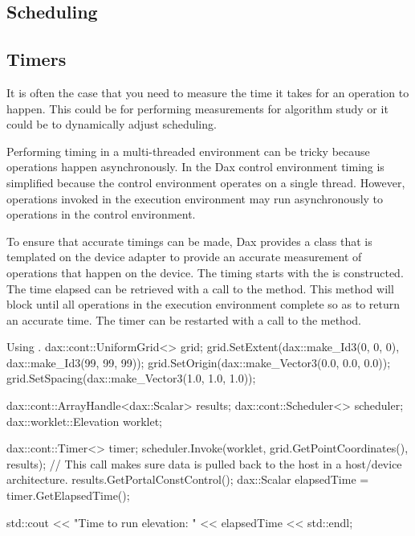 
\subsection{Scheduling}
\label{sec:Scheduling}


\subsection{Timers}
\label{sec:Timers}


It is often the case that you need to measure the time it takes for an
operation to happen. This could be for performing measurements for
algorithm study or it could be to dynamically adjust scheduling.

Performing timing in a multi-threaded environment can be tricky because
operations happen asynchronously. In the Dax control environment timing is
simplified because the control environment operates on a single
thread. However, operations invoked in the execution environment may run
asynchronously to operations in the control environment.

To ensure that accurate timings can be made, Dax provides a 
class that is templated on the device adapter to provide an accurate
measurement of operations that happen on the device. The timing starts with
the  is constructed. The time elapsed can be
retrieved with a call to the  method. This method
will block until all operations in the execution environment complete so as
to return an accurate time. The timer can be restarted with a call to the
 method.

\begin{daxexample}{Using \protect{}.}
dax::cont::UniformGrid<> grid;
grid.SetExtent(dax::make_Id3(0, 0, 0), dax::make_Id3(99, 99, 99));
grid.SetOrigin(dax::make_Vector3(0.0, 0.0, 0.0));
grid.SetSpacing(dax::make_Vector3(1.0, 1.0, 1.0));

dax::cont::ArrayHandle<dax::Scalar> results;
dax::cont::Scheduler<> scheduler;
dax::worklet::Elevation worklet;

dax::cont::Timer<> timer;
scheduler.Invoke(worklet, grid.GetPointCoordinates(), results);
// This call makes sure data is pulled back to the host in a host/device architecture.
results.GetPortalConstControl();
dax::Scalar elapsedTime = timer.GetElapsedTime();

std::cout << "Time to run elevation: " << elapsedTime << std::endl;
\end{daxexample}

